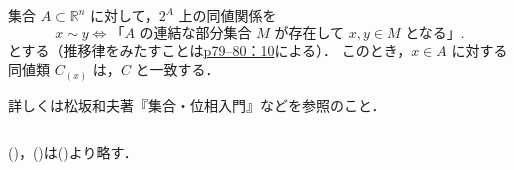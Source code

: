 \begin{column}
    集合 $A \subset \mathbb{R}^n$ に対して，$2^A$ 上の同値関係を
    \[
        x \sim y　\iff \text{「$A$ の連結な部分集合 $M$ が存在して $x, y \in M$ となる」}.
    \]
    とする（推移律をみたすことは\hyperref[p79--80：10]{p79--80：10}による）．
    このとき，$x \in A$ に対する同値類 $C_{(x)}$ は，$C$ と一致する．

    詳しくは松坂和夫著『集合・位相入門』などを参照のこと．
\end{column}



()，()は()より略す．




